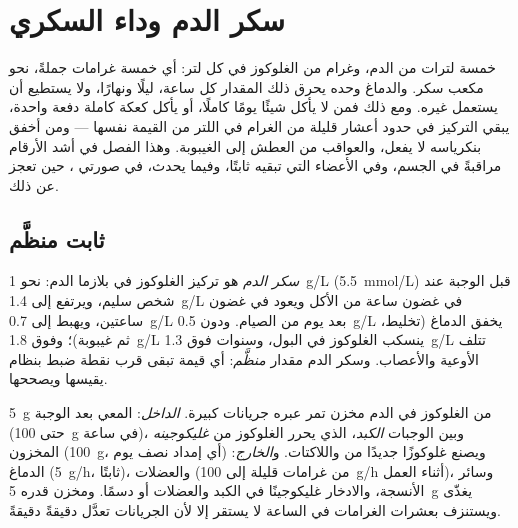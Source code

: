 \chapter{سكر الدم وداء السكري}\label{ch:g12:glucose-and-diabetes}

خمسة لترات من الدم، وغرام من الغلوكوز في كل لتر: أي خمسة غرامات جملةً،
نحو مكعب سكر. والدماغ وحده يحرق ذلك المقدار كل ساعة، ليلًا ونهارًا، ولا
يستطيع أن يستعمل غيره. ومع ذلك فمن لا يأكل شيئًا يومًا كاملًا، أو يأكل
كعكة كاملة دفعة واحدة، يبقي التركيز في حدود أعشار قليلة من الغرام في
اللتر من القيمة نفسها --- ومن أخفق بنكرياسه لا يفعل، والعواقب من العطش
إلى الغيبوبة. وهذا الفصل في أشد الأرقام مراقبةً في الجسم، وفي الأعضاء
التي تبقيه ثابتًا، وفيما يحدث، في صورتي ، حين تعجز عن ذلك.

\section{ثابت منظَّم}

\begin{definition}\label{def:g12:glucose-and-diabetes:glycaemia}
\emph{سكر الدم} هو تركيز الغلوكوز في بلازما الدم: نحو
\qty{1}{g/L} (\qty{5.5}{mmol/L}) قبل الوجبة عند شخص سليم، ويرتفع إلى
\qty{1.4}{g/L} في غضون ساعة من الأكل ويعود في غضون ساعتين، ويهبط إلى
\qty{0.7}{g/L} بعد يوم من الصيام. ودون \qty{0.5}{g/L} يخفق الدماغ
(تخليط، ثم غيبوبة)؛ وفوق \qty{1.8}{g/L} ينسكب الغلوكوز في البول،
وسنوات فوق \qty{1.3}{g/L} تتلف الأوعية والأعصاب. وسكر الدم مقدار
\emph{منظَّم}: أي قيمة تبقى قرب نقطة ضبط بنظام يقيسها ويصححها.
\end{definition}

\begin{proposition}\label{prop:g12:glucose-and-diabetes:pool}
\qty{5}{g} من الغلوكوز في الدم مخزن تمر عبره جريانات كبيرة.
\emph{الداخل}: المعي بعد الوجبة (حتى \qty{100}{g} في ساعة)، وبين
الوجبات \emph{الكبد}، الذي يحرر الغلوكوز من \emph{غليكوجينه} المخزون
(\qty{100}{g}، أي إمداد نصف يوم) ويصنع غلوكوزًا جديدًا من  واللاكتات. و\emph{الخارج}: الدماغ (\qty{5}{g/h}، ثابتًا)،
والعضلات (من غرامات قليلة إلى \qty{100}{g/h} أثناء العمل)، وسائر
الأنسجة، والادخار غليكوجينًا في الكبد والعضلات أو دسمًا. ومخزن قدره
\qty{5}{g} يغذّى ويستنزف بعشرات الغرامات في الساعة لا يستقر إلا لأن
الجريانات تعدَّل دقيقةً دقيقةً.
\end{proposition}
\admitted

